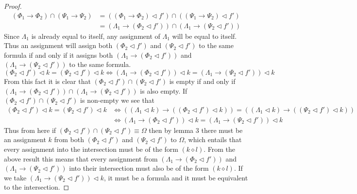 \documentclass{article}
\begin{document}
\begin{proof}
\begin{align*}
(\Phi_1\rightarrow\Phi_2)\cap(\Psi_1\rightarrow\Psi_2)
&= ((\Phi_1\rightarrow\Phi_2)\lhd f')\cap((\Psi_1\rightarrow\Psi_2)\lhd f') \\
&= (\Lambda_1\rightarrow(\Phi_2\lhd f'))\cap(\Lambda_1\rightarrow(\Psi_2\lhd f'))
\end{align*}
Since $\Lambda_1$ is already equal to itself, any assignment of $\Lambda_1$ will be equal to itself.
Thus an assignment will assign both $(\Phi_2\lhd f')$ and $(\Psi_2\lhd f')$ to the same formula if and only if it assigns both $(\Lambda_1\rightarrow(\Phi_2\lhd f'))$ and $(\Lambda_1\rightarrow(\Psi_2\lhd f'))$ to the same formula.
\begin{equation*}
(\Phi_2\lhd f')\lhd k =(\Psi_2\lhd f')\lhd k \iff
(\Lambda_1\rightarrow(\Phi_2\lhd f')) \lhd k = (\Lambda_1\rightarrow(\Psi_2\lhd f')) \lhd k
\end{equation*}
From this fact it is clear that $(\Phi_2\lhd f')\cap(\Psi_2\lhd f')$ is empty if and only if $(\Lambda_1\rightarrow(\Phi_2\lhd f'))\cap(\Lambda_1\rightarrow(\Psi_2\lhd f'))$ is also empty.
If $(\Phi_2\lhd f')\cap(\Psi_2\lhd f')$ is non-empty we see that
\begin{align*}
(\Phi_2\lhd f') \lhd k = (\Psi_2\lhd f') \lhd k
&\iff ((\Lambda_1\lhd k)\rightarrow ((\Phi_2\lhd f')\lhd k)) = ((\Lambda_1\lhd k)\rightarrow ((\Psi_2\lhd f')\lhd k)) \\
&\iff (\Lambda_1\rightarrow (\Phi_2\lhd f'))\lhd k = (\Lambda_1\rightarrow (\Psi_2\lhd f'))\lhd k
\end{align*}
Thus from here if $(\Phi_2\lhd f')\cap(\Psi_2\lhd f') \equiv \Omega$ then by lemma 3 there must be an assignment $k$ from both $(\Phi_2\lhd f')$ and $(\Psi_2\lhd f')$ to $\Omega$, 
which entails that every assignment into the intersection must be of the form $(k \diamond l)$.
From the above result this means that every assignment from $(\Lambda_1\rightarrow (\Phi_2\lhd f'))$ and $(\Lambda_1\rightarrow (\Psi_2\lhd f'))$ into their intersection must also be of the form $(k \diamond l)$.
If we take $(\Lambda_1\rightarrow (\Psi_2\lhd f'))\lhd k$, it must be a formula and it must be equivalent to the intersection.

\end{proof}
\end{document}
